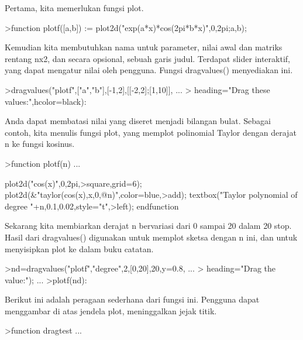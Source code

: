 \documentclass{article}
\begin{document}
\begin{eulernotebook}
\begin{eulercomment}
\begin{eulercomment}
\begin{eulercomment}
\begin{eulercomment}
\begin{eulercomment}
\begin{eulercomment}
\begin{eulercomment}
\begin{eulercomment}
\begin{eulercomment}
Pertama, kita memerlukan fungsi plot.
\end{eulercomment}
\begin{eulerprompt}
>function plotf([a,b]) := plot2d("exp(a*x)*cos(2pi*b*x)",0,2pi;a,b);
\end{eulerprompt}
\begin{eulercomment}
Kemudian kita membutuhkan nama untuk parameter, nilai awal dan matriks
rentang nx2, dan secara opsional, sebuah garis judul. Terdapat slider
interaktif, yang dapat mengatur nilai oleh pengguna. Fungsi
dragvalues() menyediakan ini.
\end{eulercomment}
\begin{eulerprompt}
>dragvalues("plotf",["a","b"],[-1,2],[[-2,2];[1,10]], ...
>  heading="Drag these values:",hcolor=black):
\end{eulerprompt}
\begin{eulercomment}
Anda dapat membatasi nilai yang diseret menjadi bilangan bulat.
Sebagai contoh, kita menulis fungsi plot, yang memplot polinomial
Taylor dengan derajat n ke fungsi kosinus.
\end{eulercomment}
\begin{eulerprompt}
>function plotf(n) ...
\end{eulerprompt}
\begin{eulerudf}
  plot2d("cos(x)",0,2pi,>square,grid=6);
  plot2d(&"taylor(cos(x),x,0,@n)",color=blue,>add);
  textbox("Taylor polynomial of degree "+n,0.1,0.02,style="t",>left);
  endfunction
\end{eulerudf}
\begin{eulercomment}
Sekarang kita membiarkan derajat n bervariasi dari 0 sampai 20 dalam
20 stop. Hasil dari dragvalues() digunakan untuk memplot sketsa dengan
n ini, dan untuk menyisipkan plot ke dalam buku catatan.
\end{eulercomment}
\begin{eulerprompt}
>nd=dragvalues("plotf","degree",2,[0,20],20,y=0.8, ...
>   heading="Drag the value:"); ...
>plotf(nd):
\end{eulerprompt}
\begin{eulercomment}
Berikut ini adalah peragaan sederhana dari fungsi ini. Pengguna dapat
menggambar di atas jendela plot, meninggalkan jejak titik.
\end{eulercomment}
\begin{eulerprompt}
>function dragtest ...

\end{eulerprompt}
\end{eulercomment}
\end{eulercomment}
\end{eulercomment}
\end{eulercomment}
\end{eulercomment}
\end{eulercomment}
\end{eulercomment}
\end{eulercomment}
\end{eulernotebook}
\end{document}
